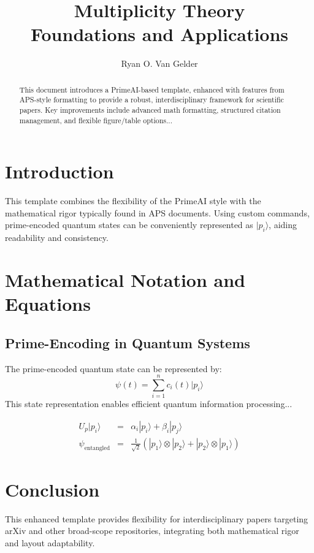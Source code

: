 \documentclass{article}
\title{Multiplicity Theory\\Foundations and Applications}
\author{Ryan O. Van Gelder}
\affil{Citizen Gardens, The Foundation of Multiplicity \\ \texttt{ryan@citizengardens.org}}
\newcommand{\primeQubit}[1]{|p_{#1}\rangle}
\begin{document}
\maketitle

\begin{abstract}
This document introduces a PrimeAI-based template, enhanced with features from APS-style formatting to provide a robust, interdisciplinary framework for scientific papers. Key improvements include advanced math formatting, structured citation management, and flexible figure/table options...
\end{abstract}


\section{Introduction}
This template combines the flexibility of the PrimeAI style with the mathematical rigor typically found in APS documents. Using custom commands, prime-encoded quantum states can be conveniently represented as $\primeQubit{i}$, aiding readability and consistency.

\section{Mathematical Notation and Equations}
\subsection{Prime-Encoding in Quantum Systems}
The prime-encoded quantum state can be represented by:
\begin{equation}
\psi(t) = \sum_{i=1}^{n} c_i(t) \primeQubit{i}
\end{equation}
This state representation enables efficient quantum information processing...

\begin{eqnarray}
U_p \primeQubit{i} &=& \alpha_i \primeQubit{i} + \beta_i \primeQubit{j} \\
\psi_{\text{entangled}} &=& \frac{1}{\sqrt{2}} (\primeQubit{1} \otimes \primeQubit{2} + \primeQubit{2} \otimes \primeQubit{1})
\end{eqnarray}

\section{Conclusion}
This enhanced template provides flexibility for interdisciplinary papers targeting arXiv and other broad-scope repositories, integrating both mathematical rigor and layout adaptability.


\end{document}
